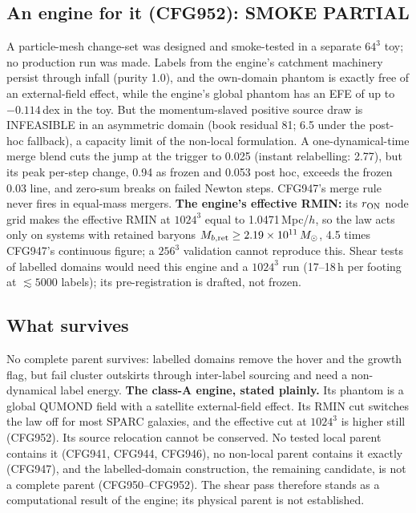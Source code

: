 \documentclass[10pt]{article}
\begin{document}
\subsection{An engine for it (CFG952): SMOKE PARTIAL}
A particle-mesh change-set was designed and smoke-tested in a separate $64^3$ toy; no production run was made. Labels from the engine's catchment machinery persist through infall (purity 1.0), and the own-domain phantom is exactly free of an external-field effect, while the engine's global phantom has an EFE of up to $-0.114$\,dex in the toy. But the momentum-slaved positive source draw is INFEASIBLE in an asymmetric domain (book residual 81; 6.5 under the post-hoc fallback), a capacity limit of the non-local formulation. A one-dynamical-time merge blend cuts the jump at the trigger to 0.025 (instant relabelling: 2.77), but its peak per-step change, 0.94 as frozen and 0.053 post hoc, exceeds the frozen 0.03 line, and zero-sum breaks on failed Newton steps. CFG947's merge rule never fires in equal-mass mergers. \textbf{The engine's effective RMIN:} its $r_{\rm ON}$ node grid makes the effective RMIN at $1024^3$ equal to 1.0471\,Mpc/$h$, so the law acts only on systems with retained baryons $M_{b,\rm ret}\ge2.19\times10^{11}\,M_\odot$, 4.5 times CFG947's continuous figure; a $256^3$ validation cannot reproduce this. Shear tests of labelled domains would need this engine and a $1024^3$ run (17--18\,h per footing at $\lesssim5000$ labels); its pre-registration is drafted, not frozen.

\subsection{What survives}
No complete parent survives: labelled domains remove the hover and the growth flag, but fail cluster outskirts through inter-label sourcing and need a non-dynamical label energy.
\textbf{The class-A engine, stated plainly.} Its phantom is a global QUMOND field with a satellite external-field effect. Its RMIN cut switches the law off for most SPARC galaxies, and the effective cut at $1024^3$ is higher still (CFG952). Its source relocation cannot be conserved. No tested local parent contains it (CFG941, CFG944, CFG946), no non-local parent contains it exactly (CFG947), and the labelled-domain construction, the remaining candidate, is not a complete parent (CFG950--CFG952). The shear pass therefore stands as a computational result of the engine; its physical parent is not established.
\end{document}
